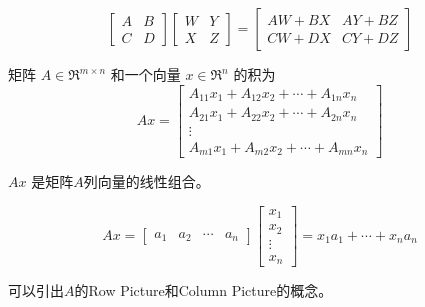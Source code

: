 \begin{definition}[分块矩阵乘法]
    \begin{equation} \left[\begin{array}{ll}A & B \\ {C} & D\end{array}\right]\left[\begin{array}{ll}W & Y \\ X & Z\end{array}\right]=\left[\begin{array}{ll}A W+B X & A Y+B Z \\ C W+D X & C Y+D Z\end{array}\right] \end{equation}
\end{definition}

\begin{definition}[矩阵-向量乘积 $Ax$]
    矩阵 $ A \in \mathfrak{R}^{m \times n} $ 和一个向量 $ x \in \mathfrak{R}^{n} $ 的积为
\begin{equation}
A x=\left[\begin{array}{c}
A_{11} x_{1}+A_{12} x_{2}+\cdots+A_{1 n} x_{n} \\
A_{21} x_{1}+A_{22} x_{2}+\cdots+A_{2 n} x_{n} \\
\vdots \\
A_{m 1} x_{1}+A_{m 2} x_{2}+\cdots+A_{m n} x_{n}
\end{array}\right]
\end{equation}
\end{definition}

\begin{corollary}
    $ {A} x $ 是矩阵$A$列向量的线性组合。

\begin{equation}
A x=\left[\begin{array}{llll}
a_{1} & a_{2} & \cdots & a_{n}
\end{array}\right]\left[\begin{array}{c}
x_{1} \\
x_{2} \\
\vdots \\
x_{n}
\end{array}\right]=x_{1} a_{1}+\cdots+x_{n} a_{n}
\end{equation}
\end{corollary}

可以引出$A$的Row Picture和Column Picture的概念。

